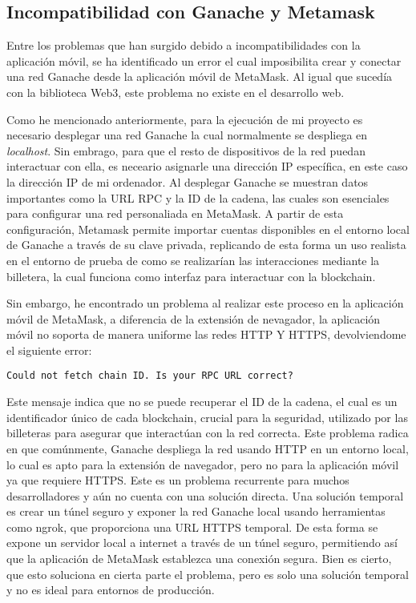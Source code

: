 \subsection{Incompatibilidad con Ganache y Metamask}

Entre los problemas que han surgido debido a incompatibilidades con la aplicación móvil, se ha identificado un error el cual imposibilita crear y conectar una red Ganache desde la aplicación móvil de MetaMask. Al igual que sucedía con la biblioteca Web3, este problema no existe en el desarrollo web.

Como he mencionado anteriormente, para la ejecución de mi proyecto es necesario desplegar una red Ganache la cual normalmente se despliega en \textit{localhost}. Sin embrago, para que el resto de dispositivos de la red puedan interactuar con ella, es neceario asignarle una dirección IP específica, en este caso la dirección IP de mi ordenador.
Al desplegar Ganache se muestran datos importantes como la URL RPC y la ID de la cadena, las cuales son esenciales para configurar una red personaliada en MetaMask.
A partir de esta configuración, Metamask permite importar cuentas disponibles en el entorno local de Ganache a través de su clave privada, replicando de esta forma un uso realista en el entorno de prueba de como se realizarían las interacciones mediante la billetera, la cual funciona como interfaz para interactuar con la blockchain.

Sin embargo, he encontrado un problema al realizar este proceso en la aplicación móvil de MetaMask, a diferencia de la extensión de nevagador, la aplicación móvil no soporta de manera uniforme las redes HTTP Y HTTPS, devolviendome el siguiente error:

\texttt{Could not fetch chain ID. Is your RPC URL correct?}

Este mensaje indica que no se puede recuperar el ID de la cadena, el cual es un identificador único de cada blockchain, crucial para la seguridad, utilizado por las billeteras para asegurar que interactúan con la red correcta.
Este problema radica en que comúnmente, Ganache despliega la red usando HTTP en un entorno local, lo cual es apto para la extensión de navegador, pero no para la aplicación móvil ya que requiere HTTPS.
Este es un problema recurrente para muchos desarrolladores y aún no cuenta con una solución directa. Una solución temporal es crear un túnel seguro y exponer la red Ganache local usando herramientas como ngrok, que proporciona una URL HTTPS temporal. De esta forma se expone un servidor local a internet a través de un túnel seguro, permitiendo así que la aplicación de MetaMask establezca una conexión segura.
Bien es cierto, que esto soluciona en cierta parte el problema, pero es solo una solución temporal y no es ideal para entornos de producción.


